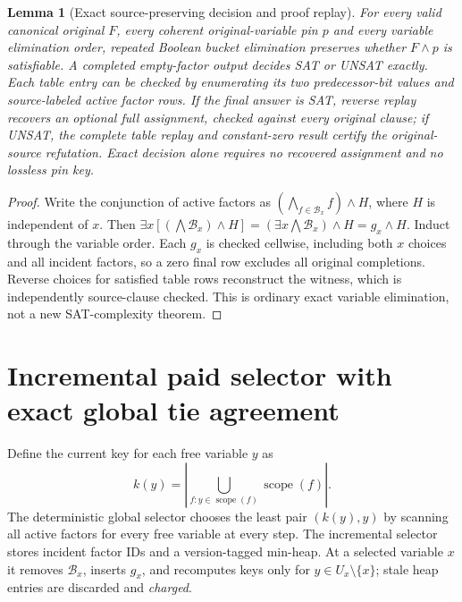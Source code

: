 \documentclass[11pt]{article}
\newtheorem{lemma}{Lemma}
\begin{document}
\begin{lemma}[Exact source-preserving decision and proof replay]\label{lem:exact}
For every valid canonical original $F$, every coherent original-variable pin $p$ and every variable elimination order, repeated Boolean bucket elimination preserves whether $F\wedge p$ is satisfiable. A completed empty-factor output decides SAT or UNSAT exactly. Each table entry can be checked by enumerating its two predecessor-bit values and source-labeled active factor rows. If the final answer is SAT, reverse replay recovers an optional full assignment, checked against every original clause; if UNSAT, the complete table replay and constant-zero result certify the original-source refutation. Exact decision alone requires no recovered assignment and no lossless pin key.
\end{lemma}
\begin{proof}
Write the conjunction of active factors as $(\bigwedge_{f\in\mathcal B_x}f)\wedge H$, where $H$ is independent of $x$. Then $\exists x[(\bigwedge\mathcal B_x)\wedge H] = (\exists x\bigwedge\mathcal B_x)\wedge H =g_x\wedge H$. Induct through the variable order. Each $g_x$ is checked cellwise, including both $x$ choices and all incident factors, so a zero final row excludes all original completions. Reverse choices for satisfied table rows reconstruct the witness, which is independently source-clause checked. This is ordinary exact variable elimination, not a new SAT-complexity theorem.
\end{proof}

\section{Incremental paid selector with exact global tie agreement}
Define the current key for each free variable $y$ as
\[
 k(y)=\left|\bigcup_{f:y\in\operatorname{scope}(f)}\operatorname{scope}(f)\right|.
\]
The deterministic global selector chooses the least pair $(k(y),y)$ by scanning all active factors for every free variable at every step. The incremental selector stores incident factor IDs and a version-tagged min-heap. At a selected variable $x$ it removes $\mathcal B_x$, inserts $g_x$, and recomputes keys only for $y\in U_x\setminus\{x\}$; stale heap entries are discarded and \emph{charged}.
\end{document}

